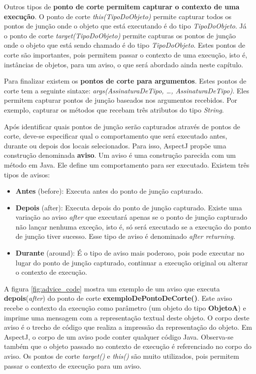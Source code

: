 Outros tipos de \textbf{ponto de corte permitem capturar o contexto de uma
execução}. O ponto de corte \textit{this(TipoDoObjeto)} permite capturar todos
os pontos de junção onde o objeto que está executando é do tipo
\textit{TipoDoObjeto}. Já o ponto de corte \textit{target(TipoDoObjeto)} permite
capturas os pontos de junção onde o objeto que está sendo chamado é do tipo
\textit{TipoDoObjeto}. Estes pontos de corte são importantes, pois permitem
passar o contexto de uma execução, isto é, instâncias de objetos, para um aviso,
o que será abordado ainda neste capítulo. 

Para finalizar existem os \textbf{pontos de corte para argumentos}.
Estes pontos de corte tem a seguinte sintaxe: \textit{args(AssinaturaDeTipo, 
\ldots , AssinaturaDeTipo)}. Eles permitem capturar pontos de junção
baseados nos argumentos recebidos. Por exemplo, capturar os métodos 
que recebam três atributos do tipo \textit{String}.

Após identificar quais pontos de junção serão capturados através de pontos de
corte, deve-se especificar qual o comportamento que será executado antes, 
durante ou depois dos locais selecionados. Para isso, AspectJ propõe uma
construção denominada \textbf{aviso}. Um aviso é uma construção parecida com um método
em Java. Ele define um comportamento para ser executado. Existem três tipos de
avisos:

\begin{itemize}
  \item \textbf{Antes} (before): Executa antes do ponto de junção capturado.
  \item \textbf{Depois} (after): Executa depois do ponto de junção capturado.
  Existe uma variação ao aviso \textit{after} que executará apenas se o ponto de
  junção capturado não lançar nenhuma exceção, isto é, só será executado se a execução
  do ponto de junção tiver sucesso. Esse tipo de aviso é denominado
  \textit{after returning}.
  \item \textbf{Durante} (around): É o tipo de aviso mais poderoso, pois
  pode executar no lugar do ponto de junção capturado, continuar a execução
  original ou alterar o contexto de execução.
\end{itemize}

A figura \ref{fig:advice_code} mostra um exemplo de um aviso que executa
\textbf{depois}(\textit{after}) do ponto de corte
\textbf{exemploDePontoDeCorte()}. Este aviso recebe o contexto da execução
como parâmetro (um objeto do tipo \textbf{ObjetoA}) e imprime uma
mensagem com a representação textual deste objeto. O corpo deste aviso é o
trecho de código que realiza a impressão da representação do objeto. Em AspectJ,
o corpo de um aviso pode conter qualquer código Java. Observa-se também que o
objeto passado no contexto de execução é referenciado no corpo do aviso. Os
pontos de corte \textit{target()} e \textit{this()} são muito utilizados, pois
permitem passar o contexto de execução para um aviso.

